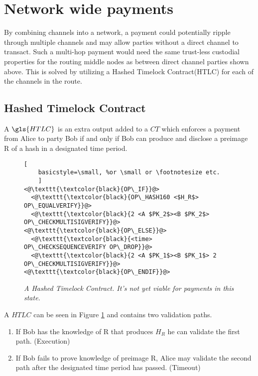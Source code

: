 \section{Network wide payments}

By combining channels into a network, a payment could potentially ripple through multiple channels and may allow parties without a direct channel to transact. Such a multi-hop payment would need the same trust-less custodial properties for the routing middle \gls{node}s as between direct channel parties shown above. This is solved by utilizing a Hashed Timelock Contract(\gls{HTLC}) for each of the channels in the route.

\subsection{Hashed Timelock Contract}

A $\gls{HTLC}$ is an extra output added to a $CT$ which enforces a payment from Alice to party Bob if and only if Bob can produce and disclose a preimage R of a \gls{hash} in a designated time period. 

\begin{figure}[hbt!]
	\centering
	\begin{lstlisting}[
	basicstyle=\small, %or \small or \footnotesize etc.
	]
<@\texttt{\textcolor{black}{OP\_IF}}@>
  <@\texttt{\textcolor{black}{OP\_HASH160 <$H_R$> OP\_EQUALVERIFY}}@>
  <@\texttt{\textcolor{black}{2 <A $PK_2$><B $PK_2$> OP\_CHECKMULTISIGVERIFY}}@>  
<@\texttt{\textcolor{black}{OP\_ELSE}}@>
  <@\texttt{\textcolor{black}{<time> OP\_CHECKSEQUENCEVERIFY OP\_DROP}}@>
  <@\texttt{\textcolor{black}{2 <A $PK_1$><B $PK_1$> 2 OP\_CHECKMULTISIGVERIFY}}@>
<@\texttt{\textcolor{black}{OP\_ENDIF}}@>
	\end{lstlisting}
	
	\caption{\textit{ A Hashed Timelock Contract. It's not yet viable for payments in this state.
	}}
	\label{fig:HTLC}
\end{figure}

A $HTLC$ can be seen in Figure \ref{fig:HTLC} and contains two validation paths. 

\begin{enumerate}
	\item If Bob has the knowledge of R that produces $H_{R}$ he can validate the first path. (Execution)
	\item If Bob fails to prove knowledge of preimage R, Alice may validate the second path after the designated time period has passed. (Timeout)
\end{enumerate}

